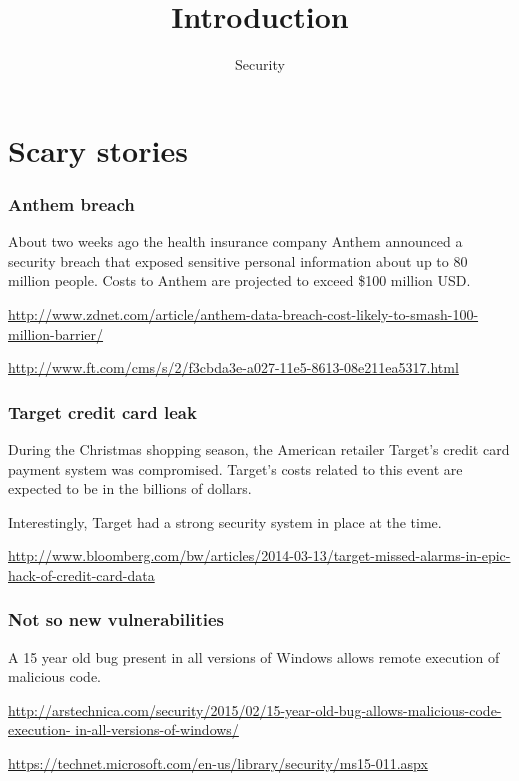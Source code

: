 \documentclass[10pt]{beamer}
\title{Introduction}
\author[IN618]{Security}
\institute[Otago Polytechnic]{
  Otago Polytechnic \\
  Dunedin, New Zealand \\
}
\date{}
\begin{document}
\begin{frame}[plain]
  \titlepage
\end{frame}

\section {Scary stories}

\begin{frame}
	\frametitle{Anthem breach}

	About two weeks ago the health insurance company Anthem 
	announced a security breach that exposed sensitive personal
	information about up to 80 million people.  Costs to Anthem 
	are projected to exceed \$100 million USD.

	\vspace{10mm}
	\url{http://www.zdnet.com/article/anthem-data-breach-cost-likely-to-smash-100-million-barrier/}

	\vspace{10mm}
	\url{http://www.ft.com/cms/s/2/f3cbda3e-a027-11e5-8613-08e211ea5317.html}
\end{frame}

\begin{frame}
	\frametitle{Target credit card leak}

	During the Christmas shopping season, the American retailer Target's
	credit card payment system was compromised.  Target's costs related
	to this event are expected to be in the billions of dollars.

	\vspace{10mm}
	Interestingly, Target had a strong security system in place at the time.

	\vspace{10mm}
	\url{http://www.bloomberg.com/bw/articles/2014-03-13/target-missed-alarms-in-epic-hack-of-credit-card-data}
\end{frame}

\begin{frame}
	\frametitle{Not so new vulnerabilities}

	A 15 year old bug present in all versions of Windows allows 
	remote execution of malicious code.

	\vspace{10mm}
	\url{http://arstechnica.com/security/2015/02/15-year-old-bug-allows-malicious-code-execution-
	in-all-versions-of-windows/}

	\vspace{10mm}
	\url{https://technet.microsoft.com/en-us/library/security/ms15-011.aspx}
\end{frame}
\end{document}
